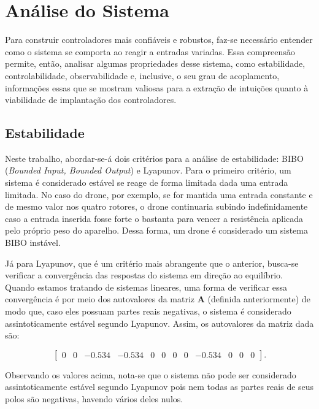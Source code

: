 \section{Análise do Sistema}
Para construir controladores mais confiáveis e robustos, faz-se necessário entender como o sistema se comporta ao 
reagir a entradas variadas. Essa compreensão permite, então, analisar algumas propriedades desse sistema, como 
estabilidade, controlabilidade, observabilidade e, inclusive, o seu grau de acoplamento, informações essas 
que se mostram valiosas para a extração de intuições quanto à viabilidade de implantação dos controladores.

\subsection{Estabilidade}
Neste trabalho, abordar-se-á dois critérios para a análise de estabilidade: BIBO (\textit{Bounded Input, Bounded 
Output}) e Lyapunov. Para o primeiro critério, 
um sistema é considerado estável se reage de forma limitada dada uma entrada limitada. No caso do drone, por exemplo, 
se for mantida uma entrada constante e de mesmo valor nos quatro rotores, o drone continuaria subindo indefinidamente 
caso a entrada inserida fosse forte o bastanta para vencer a resistência aplicada pelo próprio peso do aparelho. Dessa 
forma, um drone é considerado um sistema BIBO instável.

Já para Lyapunov, que é um critério mais abrangente que o anterior, busca-se verificar a convergência das respostas 
do sistema em direção ao equilíbrio. Quando estamos tratando de sistemas lineares, uma forma de verificar essa 
convergência é por meio dos autovalores da matriz $\mathbf{A}$ (definida anteriormente) de modo que, caso eles possuam 
partes reais negativas, o sistema é considerado assintoticamente estável segundo Lyapunov. Assim, os autovalores 
da matriz dada são:

\begin{equation*}
    \left[\begin{array}{cccccccccccc}
        0 & 0 & -0.534 & -0.534 & 0 & 0 & 0 & 0 & -0.534 & 0 & 0 & 0
    \end{array}\right].
\end{equation*}

Observando os valores acima, nota-se que o sistema não pode ser considerado assintoticamente estável segundo Lyapunov 
pois nem todas as partes reais de seus polos são negativas, havendo vários deles nulos.

